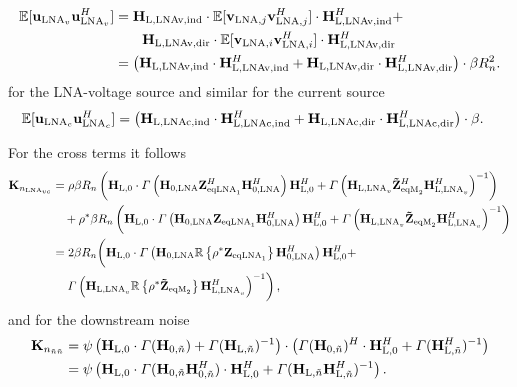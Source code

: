 \begin{align}
\nonumber
\mathbb{E}[\mathbf{u}_{\text{LNA}_v}\mathbf{u}_{\text{LNA}_v}^H]&=
	\mathbf{H}_\text{L,LNAv,ind}\cdot
	\mathbb{E}[\mathbf{v}_{\text{LNA},j}\mathbf{v}_{\text{LNA},j}^H]\cdot
	\mathbf{H}_\text{L,LNAv,ind}^H+\\\nonumber
&\qquad \mathbf{H}_\text{L,LNAv,dir}\cdot
	\mathbb{E}[\mathbf{v}_{\text{LNA},i}\mathbf{v}_{\text{LNA},i}^H]\cdot
	\mathbf{H}_\text{L,LNAv,dir}^H\\
&=\left(\mathbf{H}_\text{L,LNAv,ind}\cdot\mathbf{H}_\text{L,LNAv,ind}^H+
	\mathbf{H}_\text{L,LNAv,dir}\cdot\mathbf{H}_\text{L,LNAv,dir}^H\right)\cdot \beta R_n^2.
\end{align}
for the LNA-voltage source and similar for the current source
\begin{align}
\mathbb{E}[\mathbf{u}_{\text{LNA}_c}\mathbf{u}_{\text{LNA}_c}^H]&= 
\left(\mathbf{H}_\text{L,LNAc,ind}\cdot\mathbf{H}_\text{L,LNAc,ind}^H+
	\mathbf{H}_\text{L,LNAc,dir}\cdot\mathbf{H}_\text{L,LNAc,dir}^H\right)\cdot \beta.
\end{align}

For the cross terms it follows
\begin{align}
\nonumber
\mathbf{K}_{n_{\text{LNA}_{vc}}} &= \rho\beta R_n
\left(\mathbf{H}_\text{L,0}\cdot\Gamma\left(\mathbf{H}_\text{0,LNA}\mathbf{Z}_{\text{eqLNA}_1}^H\mathbf{H}_\text{0,LNA}^H\right)\mathbf{H}_\text{L,0}^H + 
\Gamma\left(\mathbf{H}_{\text{L,LNA}_v}\mathbf{\tilde{Z}}_{\text{eqM}_2}^H\mathbf{H}_{\text{L,LNA}_v}^H\right)^{-1}\right)\\\nonumber
&\quad+
\rho^*\beta R_n
\left(\mathbf{H}_\text{L,0}\cdot\Gamma\left(\mathbf{H}_\text{0,LNA}\mathbf{Z}_{\text{eqLNA}_1}\mathbf{H}_\text{0,LNA}^H\right)\mathbf{H}_\text{L,0}^H + 
\Gamma\left(\mathbf{H}_{\text{L,LNA}_v}\mathbf{\tilde{Z}}_{\text{eqM}_2}\mathbf{H}_{\text{L,LNA}_v}^H\right)^{-1}\right)\\\nonumber
&= 2 \beta R_n\biggl(
\mathbf{H}_\text{L,0}\cdot\Gamma\left(\mathbf{H}_\text{0,LNA}\mathbb{R}\left\{\rho^*\mathbf{Z}_{\text{eqLNA}_1}\right\}\mathbf{H}_\text{0,LNA}^H\right)\mathbf{H}_\text{L,0}^H + \\
&\quad\left.\Gamma\left(\mathbf{H}_{\text{L,LNA}_v}\mathbb{R}\left\{\rho^*\mathbf{\tilde{Z}}_{\text{eqM}_2}\right\}\mathbf{H}_{\text{L,LNA}_v}^H\right)^{-1}\right),
\end{align}
and for the downstream noise
\begin{align}
\nonumber
\mathbf{K}_{n_{\tilde{n}\tilde{n}}}
&=\psi\left(\mathbf{H}_\text{L,0}\cdot\Gamma(\mathbf{H}_{0,\tilde{n}})+
	\Gamma(\mathbf{H}_{\text{L},\tilde{n}})^{-1}\right)\cdot
\left(\Gamma(\mathbf{H}_{\text{0},\tilde{n}})^H\cdot\mathbf{H}_\text{L,0}^H+
	\Gamma(\mathbf{H}_{\text{L},\tilde{n}}^H)^{-1}\right)\\
&=\psi\left(\mathbf{H}_\text{L,0}\cdot\Gamma(\mathbf{H}_{\text{0},\tilde{n}}
	\mathbf{H}_{\text{0},\tilde{n}}^H)\cdot\mathbf{H}_{\text{L},0}^H + 
	\Gamma(\mathbf{H}_{\text{L},\tilde{n}}\mathbf{H}_{\text{L},\tilde{n}}^H)^{-1}\right).
\end{align}

